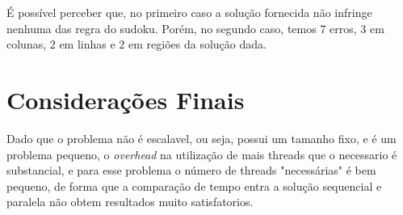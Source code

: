\documentclass[a4paper, 12pt]{article}
\begin{document}
É possível perceber que, no primeiro caso a solução fornecida não infringe
nenhuma das regra do sudoku. Porém, no segundo caso, temos 7 erros, 3 em
colunas, 2 em linhas e 2 em regiões da solução dada.

\section{Considerações Finais}
Dado que o problema não é escalavel, ou seja, possui um tamanho fixo, e é um
problema pequeno, o \textit{overhead} na utilização de mais threads que o
necessario é substancial, e para esse problema o número de threads "necessárias"
é bem pequeno,  de forma que a comparação de tempo entra a solução sequencial e
paralela não obtem resultados muito satisfatorios.
\end{document}
